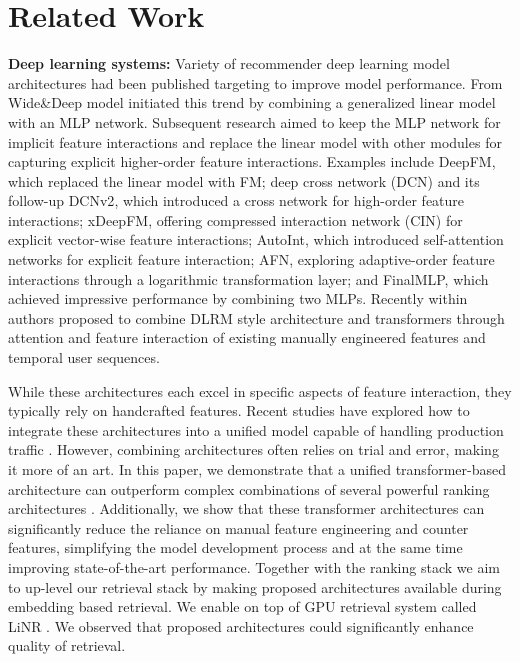 \section{Related Work}\label{sec:related_work}

\textbf{Deep learning systems:} Variety of recommender deep learning model architectures had been published targeting to improve model performance.  From Wide\&Deep model\cite{wideDeep2016} initiated this trend by combining a generalized linear model with an MLP network. Subsequent research aimed to keep the MLP network for implicit feature interactions and replace the linear model with other modules for capturing explicit higher-order feature interactions. Examples include DeepFM\cite{Guo2017DeepFMAF}, which replaced the linear model with FM; deep cross network (DCN)\cite{Wang2017DeepC} and its follow-up DCNv2\cite{Wang2020DCNVI}, which introduced a cross network for high-order feature interactions; xDeepFM\cite{Lian2018xDeepFMCE}, offering compressed interaction network (CIN) for explicit vector-wise feature interactions; AutoInt\cite{Song2018AutoIntAF}, which introduced self-attention networks for explicit feature interaction; AFN\cite{Cheng2019AdaptiveFN}, exploring adaptive-order feature interactions through a logarithmic transformation layer; and FinalMLP\cite{Mao2023FinalMLPAE}, which achieved impressive performance by combining two MLPs. Recently within \cite{zeng2024interformer} authors proposed to combine DLRM style architecture and transformers through attention and feature interaction of existing manually engineered features and temporal user sequences.

While these architectures each excel in specific aspects of feature interaction, they typically rely on handcrafted features. Recent studies have explored how to integrate these architectures into a unified model capable of handling production traffic \cite{LiRank_paper}. However, combining architectures often relies on trial and error, making it more of an art.
In this paper, we demonstrate that a unified transformer-based architecture can outperform complex combinations of several powerful ranking architectures \cite{LiRank_paper}. Additionally, we show that these transformer architectures can significantly reduce the reliance on manual feature engineering and counter features, simplifying the model development process and at the same time improving state-of-the-art performance. Together with the ranking stack we aim to up-level our retrieval stack by making proposed architectures available during embedding based retrieval. We enable {\systemname} on top of GPU retrieval system called LiNR \cite{Linr_paper}. We observed that proposed architectures could significantly enhance quality of retrieval.

